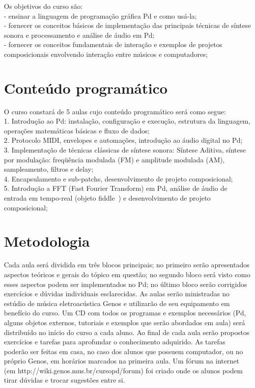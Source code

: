 \documentclass{article}
\begin{document}
Os objetivos do curso são:\\
- ensinar a linguagem de programação gráfica Pd e como usá-la;\\
- fornecer os conceitos básicos de implementação das principais técnicas de síntese sonora
e processamento e análise de áudio em Pd;\\
- fornecer os conceitos fundamentais de interação e exemplos de projetos composicionais
envolvendo interação entre músicos e computadores;\\


\section {Conteúdo programático}

O curso constará de 5 aulas cujo conteúdo programático será como segue:\\
1. Introdução ao Pd:
instalação, configuração e execução, estrutura da linguagem, operações matemáticas básicas
e fluxo de dados;\\
2. Protocolo MIDI, envelopes e automações, introdução ao áudio digital no Pd;\\
3. Implementação de técnicas clássicas de síntese sonora: Síntese Aditiva,
síntese por modulação: freqüência modulada (FM) e amplitude modulada (AM),
sampleamento, filtros e delay;\\
4. Encapsulamento e sub-patchs, desenvolvimento de projeto composicional;\\
5. Introdução a FFT (Fast Fourier Transform) em Pd, análise de áudio de entrada em
tempo-real (objeto fiddle~) e desenvolvimento de projeto composicional;


\section {Metodologia}

       Cada aula será dividida em três blocos principais; no primeiro serão apresentados
aspectos teóricos e gerais do tópico em questão; no segundo bloco será visto como esses
aspectos podem ser implementados no Pd; no último bloco serão corrigidos exercícios e
dúvidas individuais esclarecidas.
       As aulas serão ministradas no estúdio de música eletroacústica Genos e utilizarão de
seu equipamento em benefício do curso. Um CD com todos os programas e exemplos
necessários (Pd, alguns objetos externos, tutoriais e exemplos que serão abordados em aula)
será distribuído no início do curso a cada aluno. Ao final de cada aula serão propostos
exercícios e tarefas para aprofundar o conhecimento adquirido. As tarefas poderão ser feitas
em casa, no caso dos alunos que possuem computador, ou no próprio Genos, em horários
marcados        na      primeira     aula.    Um      fórum       na       internet     (em
http://wiki.genos.mus.br/cursopd/forum) foi criado onde os alunos podem tirar dúvidas e
trocar sugestões entre si.
\end{document}
